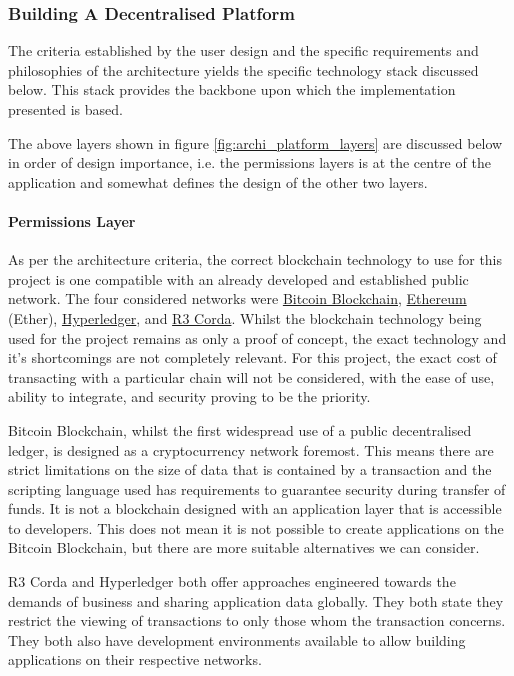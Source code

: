 \subsubsection{Building A Decentralised Platform}

The criteria established by the user design and the specific requirements and philosophies of the architecture yields the specific technology stack discussed below. This stack provides the backbone upon which the implementation presented is based.



The above layers shown in figure \ref{fig:archi_platform_layers} are discussed below in order of design importance, i.e. the permissions layers is at the centre of the application and somewhat defines the design of the other two layers.

\paragraph{Permissions Layer}

As per the architecture criteria, the correct blockchain technology to use for this project is one compatible with an already developed and established public network. The four considered networks were \href{https://bitcoin.org/en/}{Bitcoin Blockchain}, \href{https://www.ethereum.org/}{Ethereum} (Ether), \href{https://www.hyperledger.org/}{Hyperledger}, and \href{https://www.corda.net/}{R3 Corda}. Whilst the blockchain technology being used for the project remains as only a proof of concept, the exact technology and it's shortcomings are not completely relevant. For this project, the exact cost of transacting with a particular chain will not be considered, with the ease of use, ability to integrate, and security proving to be the priority.

Bitcoin Blockchain, whilst the first widespread use of a public decentralised ledger, is designed as a cryptocurrency network foremost. This means there are strict limitations on the size of data that is contained by a transaction and the scripting language used has requirements to guarantee security during transfer of funds. It is not a blockchain designed with an application layer that is accessible to developers. This does not mean it is not possible to create applications on the Bitcoin Blockchain, but there are more suitable alternatives we can consider.

R3 Corda and Hyperledger both offer approaches engineered towards the demands of business and sharing application data globally. They both state they restrict the viewing of transactions to only those whom the transaction concerns. They both also have development environments available to allow building applications on their respective networks. 

